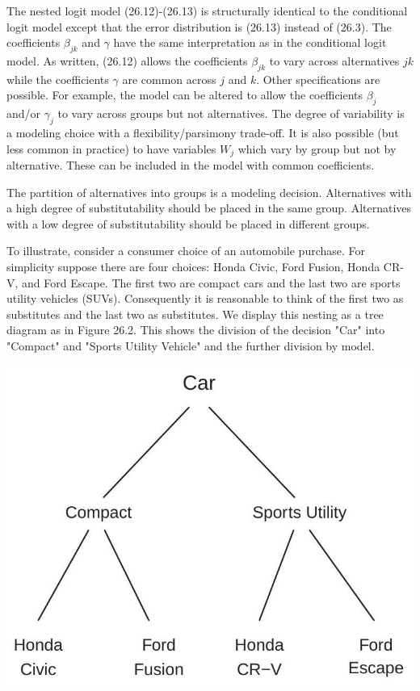 \documentclass[10pt]{article}
\begin{document}
The nested logit model (26.12)-(26.13) is structurally identical to the conditional logit model except that the error distribution is (26.13) instead of (26.3). The coefficients $\beta_{j k}$ and $\gamma$ have the same interpretation as in the conditional logit model. As written, (26.12) allows the coefficients $\beta_{j k}$ to vary across alternatives $j k$ while the coefficients $\gamma$ are common across $j$ and $k$. Other specifications are possible. For example, the model can be altered to allow the coefficients $\beta_{j}$ and/or $\gamma_{j}$ to vary across groups but not alternatives. The degree of variability is a modeling choice with a flexibility/parsimony trade-off. It is also possible (but less common in practice) to have variables $W_{j}$ which vary by group but not by alternative. These can be included in the model with common coefficients.

The partition of alternatives into groups is a modeling decision. Alternatives with a high degree of substitutability should be placed in the same group. Alternatives with a low degree of substitutability should be placed in different groups.

To illustrate, consider a consumer choice of an automobile purchase. For simplicity suppose there are four choices: Honda Civic, Ford Fusion, Honda CR-V, and Ford Escape. The first two are compact cars and the last two are sports utility vehicles (SUVs). Consequently it is reasonable to think of the first two as substitutes and the last two as substitutes. We display this nesting as a tree diagram as in Figure 26.2. This shows the division of the decision "Car" into "Compact" and "Sports Utility Vehicle" and the further division by model.

\includegraphics[max width=\textwidth]{2022_10_23_114e68a1ccdd7fb263a3g-10}
\end{document}
